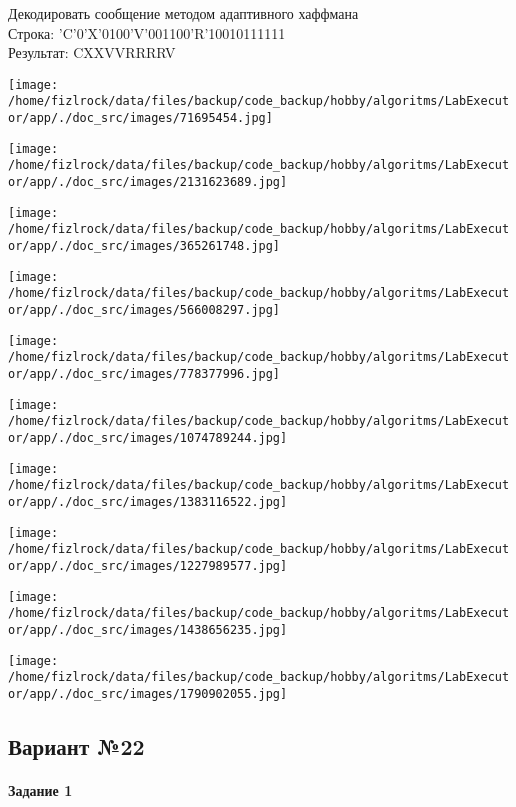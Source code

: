 \documentclass[a4paper, 12pt]{article}
\begin{document}
Декодировать сообщение методом адаптивного хаффмана \\
Строка: 
'C'0'X'0100'V'001100'R'10010111111\\
Результат: CXXVVRRRRV

\texttt{[image: /home/fizlrock/data/files/backup/code\_backup/hobby/algoritms/LabExecutor/app/./doc\_src/images/71695454.jpg]}

\texttt{[image: /home/fizlrock/data/files/backup/code\_backup/hobby/algoritms/LabExecutor/app/./doc\_src/images/2131623689.jpg]}

\texttt{[image: /home/fizlrock/data/files/backup/code\_backup/hobby/algoritms/LabExecutor/app/./doc\_src/images/365261748.jpg]}

\texttt{[image: /home/fizlrock/data/files/backup/code\_backup/hobby/algoritms/LabExecutor/app/./doc\_src/images/566008297.jpg]}

\texttt{[image: /home/fizlrock/data/files/backup/code\_backup/hobby/algoritms/LabExecutor/app/./doc\_src/images/778377996.jpg]}

\texttt{[image: /home/fizlrock/data/files/backup/code\_backup/hobby/algoritms/LabExecutor/app/./doc\_src/images/1074789244.jpg]}

\texttt{[image: /home/fizlrock/data/files/backup/code\_backup/hobby/algoritms/LabExecutor/app/./doc\_src/images/1383116522.jpg]}

\texttt{[image: /home/fizlrock/data/files/backup/code\_backup/hobby/algoritms/LabExecutor/app/./doc\_src/images/1227989577.jpg]}

\texttt{[image: /home/fizlrock/data/files/backup/code\_backup/hobby/algoritms/LabExecutor/app/./doc\_src/images/1438656235.jpg]}

\texttt{[image: /home/fizlrock/data/files/backup/code\_backup/hobby/algoritms/LabExecutor/app/./doc\_src/images/1790902055.jpg]}
\pagebreak
\subsection{Вариант №22}
\paragraph{Задание 1}
\end{document}
